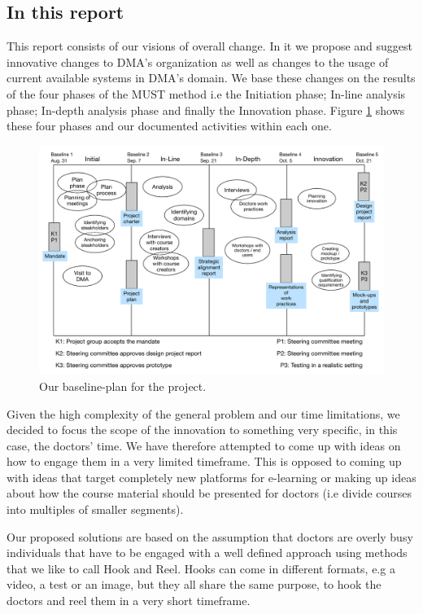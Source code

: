 \subsection{In this report}
This report consists of our visions of overall change. In it we propose and suggest innovative changes to DMA’s organization as well as changes to the usage of current available systems in DMA’s domain. We base these changes on the results of the four phases of the MUST method \cite{bodker} i.e the Initiation phase; In-line analysis phase; In-depth analysis phase and finally the Innovation phase. Figure \ref{fig:baseline_plan} shows these four phases and our documented activities within each one.

\begin{figure}[h!]
 \begin{center}
  \includegraphics[width=1\textwidth]{figures/baseline-plan.pdf}
  \caption{Our baseline-plan for the project.\label{fig:baseline_plan}}
 \end{center}
\end{figure}



Given the high complexity of the general problem and our time limitations, we decided to focus the scope of the innovation to something very specific, in this case, the doctors’ time. We have therefore attempted to come up with ideas on how to engage them in a very limited timeframe. This is opposed to coming up with ideas that target completely new platforms for e-learning or making up ideas about how the course material should be presented for doctors (i.e divide courses into multiples of smaller segments).

Our proposed solutions are based on the assumption that doctors are overly busy individuals that have to be engaged with a well defined approach using methods that we like to call Hook and Reel. Hooks can come in different formats, e.g a video, a test or an image, but they all share the same purpose, to hook the doctors and reel them in a very short timeframe.

